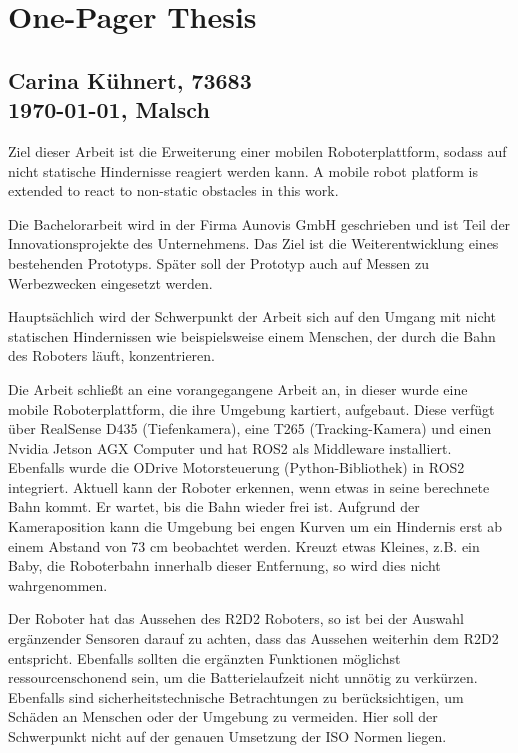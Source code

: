 
\section{One-Pager Thesis} 
\subsection*{Carina Kühnert, 73683\\ \today{}, Malsch}

Ziel dieser Arbeit ist die Erweiterung einer mobilen Roboterplattform, sodass auf nicht statische Hindernisse reagiert werden kann.
A mobile robot platform is extended to react to non-static obstacles in this work.

Die Bachelorarbeit wird in der Firma Aunovis GmbH geschrieben und ist Teil der Innovationsprojekte des Unternehmens.
Das Ziel ist die Weiterentwicklung eines bestehenden Prototyps.
Später soll der Prototyp auch auf Messen zu Werbezwecken eingesetzt werden.

Hauptsächlich wird der Schwerpunkt der Arbeit sich auf den Umgang mit nicht statischen Hindernissen wie 
beispielsweise einem Menschen, der durch die Bahn des Roboters läuft, konzentrieren.

Die Arbeit schließt an eine vorangegangene Arbeit an, 
in dieser wurde eine mobile Roboterplattform, die ihre Umgebung kartiert, aufgebaut.
Diese verfügt über RealSense D435 (Tiefenkamera), eine T265 (Tracking-Kamera) und einen Nvidia Jetson AGX Computer
und hat ROS2 als Middleware installiert. Ebenfalls wurde die ODrive Motorsteuerung (Python-Bibliothek) in ROS2 integriert.
Aktuell kann der Roboter erkennen, wenn etwas in seine berechnete Bahn kommt. Er wartet, bis die Bahn wieder frei ist. 
Aufgrund der Kameraposition kann die Umgebung bei engen Kurven um ein Hindernis erst ab einem Abstand von 73 cm beobachtet werden. Kreuzt etwas Kleines, z.B. 
ein Baby, die Roboterbahn innerhalb dieser Entfernung, so wird dies nicht wahrgenommen. 

Der Roboter hat das Aussehen des R2D2 Roboters, so ist bei der Auswahl ergänzender Sensoren darauf zu achten, 
dass das Aussehen weiterhin dem R2D2 entspricht. Ebenfalls sollten die ergänzten Funktionen möglichst ressourcenschonend sein, 
um die Batterielaufzeit nicht unnötig zu verkürzen. 
Ebenfalls sind sicherheitstechnische Betrachtungen zu berücksichtigen, um Schäden an Menschen oder der Umgebung zu vermeiden.
Hier soll der Schwerpunkt nicht auf der genauen Umsetzung der ISO Normen liegen.

